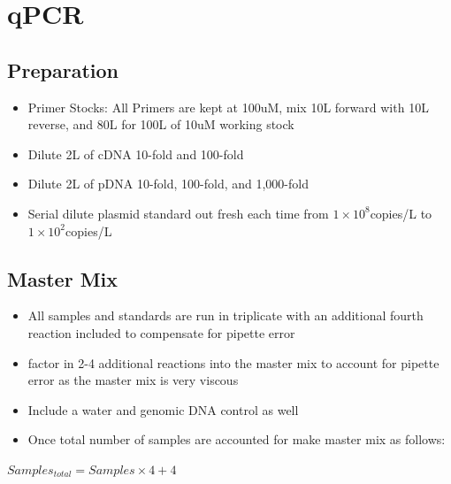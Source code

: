 \documentclass[a4paper]{article}
\begin{document}
\section{qPCR}
    	\subsection{Preparation}
		\begin{itemize}
        	
            \item Primer Stocks: All Primers are kept at 100uM, mix 10\textmu L forward with 10\textmu L reverse, and 80\textmu L for 100\textmu L of 10uM working stock
            
            \item Dilute 2\textmu L of cDNA 10-fold and 100-fold
            
            \item Dilute 2\textmu L of pDNA 10-fold, 100-fold, and 1,000-fold
            
            \item Serial dilute plasmid standard out fresh each time from $1\times10^8$copies/\textmu L to $1\times10^2$copies/\textmu L 
        \end{itemize}
	\subsection{Master Mix}
    	\begin{itemize}
        	
            \item All samples and standards are run in triplicate with an additional fourth reaction included to compensate for pipette error
            
            \item factor in 2-4 additional reactions into the master mix to account for pipette error as the master mix is very viscous
            
            \item Include a water and genomic DNA control as well
            
            \item Once total number of samples are accounted for make master mix as follows:
             
        \end{itemize}
        \begin{center}
        	
            $Samples_{total} = Samples\times4 + 4$
		\end{center}
        
\end{document}
